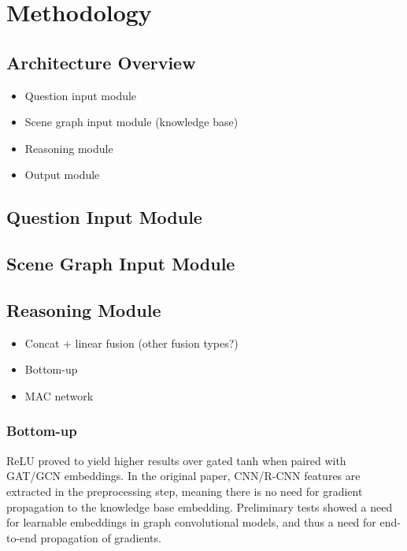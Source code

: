 \chapter{Methodology}
\label{chapter:methodology}

\section{Architecture Overview}
\label{section:architecture_overview}

\begin{itemize}
  \item Question input module
  \item Scene graph input module (knowledge base)
  \item Reasoning module
  \item Output module
\end{itemize}

\section{Question Input Module}
\label{section:question_input_module}

\section{Scene Graph Input Module}
\label{section:scene_graph_input_module}

\section{Reasoning Module}
\label{section:reasoning_module}

\begin{itemize}
  \item Concat + linear fusion (other fusion types?)
  \item Bottom-up
  \item MAC network
\end{itemize}

\subsection{Bottom-up}
\label{subsection:bottom_up}

{\color{red} ReLU proved to yield higher results over gated tanh when paired with GAT/GCN embeddings. In the original paper, CNN/R-CNN features are extracted in the preprocessing step, meaning there is no need for gradient propagation to the knowledge base embedding. Preliminary tests showed a need for learnable embeddings in graph convolutional models, and thus a need for end-to-end propagation of gradients.}

